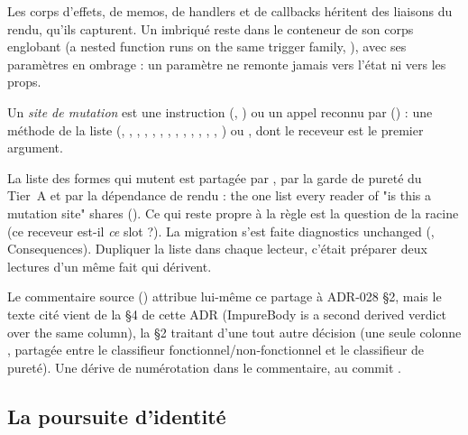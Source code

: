 
Les corps d'effets, de memos, de handlers et de callbacks héritent des liaisons du rendu, qu'ils capturent. Un  imbriqué reste dans le conteneur de son corps englobant (\og a nested function runs on the same trigger family\fg, ), avec ses paramètres en ombrage : un paramètre ne remonte jamais vers l'état ni vers les props.

Un \emph{site de mutation} est une instruction  (, ) ou un appel reconnu par  () : une méthode de la liste  (, , , , , , , , , , , , , ) ou , dont le receveur est le premier argument.

\begin{decision}
La liste des formes qui mutent est partagée par , par la garde de pureté du Tier~A et par la dépendance de rendu : \og the one list every reader of "is this a mutation site" shares\fg{} (). Ce qui reste propre à la règle est la question de la racine (\og ce receveur est-il \emph{ce} slot ?\fg). La migration s'est faite \og diagnostics unchanged\fg{} (, Consequences). Dupliquer la liste dans chaque lecteur, c'était préparer deux lectures d'un même fait qui dérivent.
\end{decision}

\begin{piege}
Le commentaire source () attribue lui-même ce partage à \og ADR-028 §2\fg, mais le texte cité vient de la §4 de cette ADR (\og ImpureBody is a second derived verdict over the same column\fg), la §2 traitant d'une tout autre décision (une seule colonne , partagée entre le classifieur fonctionnel/non-fonctionnel et le classifieur de pureté). Une dérive de numérotation dans le commentaire, au commit \snapshotCommit.
\end{piege}

\subsection{La poursuite d'identité}

